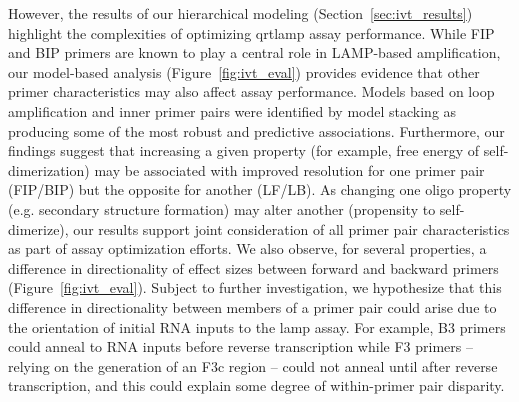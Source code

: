 \documentclass[../thesis.tex]{subfiles}
\begin{document}
However, the results of our hierarchical modeling (Section~\ref{sec:ivt_results}) highlight the complexities of optimizing \gls{qrtlamp} assay performance. While FIP and BIP primers are known to play a central role in LAMP-based amplification, our model-based analysis (Figure~\ref{fig:ivt_eval}) provides evidence that other primer characteristics may also affect assay performance. Models based on loop amplification and inner primer pairs were identified by model stacking as producing some of the most robust and predictive associations. Furthermore, our findings suggest that increasing a given property (for example, free energy of self-dimerization) may be associated with improved resolution for one primer pair (FIP/BIP) but the opposite for another (LF/LB). As changing one oligo property (e.g. secondary structure formation) may alter another (propensity to self-dimerize), our results support joint consideration of all primer pair characteristics as part of assay optimization efforts. %
We also observe, for several properties, a difference in directionality of effect sizes between forward and backward primers (Figure~\ref{fig:ivt_eval}). Subject to further investigation, we hypothesize that this difference in directionality between members of a primer pair could arise due to the orientation of initial RNA inputs to the \gls{lamp} assay. For example, B3 primers could anneal to RNA inputs before reverse transcription while F3 primers -- relying on the generation of an F3c region -- could not anneal until after reverse transcription, and this could explain some degree of within-primer pair disparity.
\end{document}
